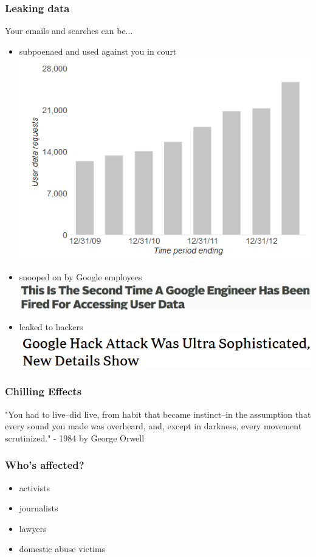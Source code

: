 \documentclass{beamer}
\begin{document}
\begin{frame}
  \frametitle{Leaking data}
  
  Your emails and searches can be...
  
  \begin{itemize}
    \item subpoenaed and used against you in court
    \includegraphics[height=.35\textheight]{google_requestgraph}
    \item snooped on by Google employees
    \includegraphics[width=.8\textwidth]{userdata_google}
    \item leaked to hackers
    \includegraphics[width=.8\textwidth]{google_hack}
  \end{itemize}

\end{frame}

\begin{frame}
  \frametitle{Chilling Effects}
  
  "You had to live--did live, from habit that became
  instinct--in the assumption that every sound you
  made was overheard, and, except in darkness,
  every movement scrutinized."
  - 1984 by George Orwell
  
\end{frame}

\begin{frame}
  \frametitle{Who's affected?}
  
  \begin{itemize}
    \item activists
    \item journalists
    \item lawyers
    \item domestic abuse victims
  \end{itemize}

\end{frame}
\end{document}
